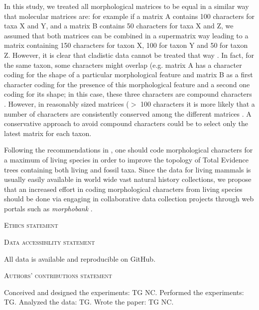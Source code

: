 \documentclass[12pt,letterpaper]{article}
\renewcommand{\section}[1]{%
\bigskip
\begin{center}
\begin{Large}
\normalfont\scshape #1
\medskip
\end{Large}
\end{center}}
\begin{document}
In this study, we treated all morphological matrices to be equal in a similar way that molecular matrices are: for example if a matrix A contains 100 characters for taxa X and Y, and a matrix B contains 50 characters for taxa X and Z, we assumed that both matrices can be combined in a supermatrix way leading to a matrix containing 150 characters for taxon X, 100 for taxon Y and 50 for taxon Z.
However, it is clear that cladistic data cannot be treated that way \citep{Brazeau2011}.
In fact, for the same taxon, some characters might overlap (e.g.
matrix A has a character coding for the shape of a particular morphological feature and matrix B as a first character coding for the presence of this morphological feature and a second one coding for its shape; in this case, these three characters are compound characters \citep{Brazeau2011}.
However, in reasonably sized matrices ($>$ 100 characters \citep{GuillermeCooper,harrisonamong-character2014} it is more likely that a number of characters are consistently conserved among the different matrices \citep[e.g.][]{ross1998phylogenetic,seiffert2003fossil,marivaux2005anthropoid,seiffert2005basal,bloch2007new,kay2008anatomy,silcox2008biogeographic,seiffert2009convergent,tabuce2009anthropoid,boyer2010astragalar,seiffert2010fossil,marivaux2013djebelemur,ni2013oldest}.
A conservative approach to avoid compound characters could be to select only the latest matrix for each taxon.

Following the recommendations in \citep{GuillermeCooper}, one should code morphological characters for a maximum of living species in order to improve the topology of Total Evidence trees containing both living and fossil taxa.
Since the data for living mammals is usually easily available in world wide vast natural history collections, we propose that an increased effort in coding morphological characters from living species should be done via engaging in collaborative data collection projects through web portals such as \textit{morphobank} \citep{morphobank}.

\section{Ethics statement}
\section{Data accessibility statement}
All data is available and reproducible on GitHub.
\section{Authors’ contributions statement}
Conceived and designed the experiments: TG NC. Performed the experiments: TG. Analyzed the data: TG. Wrote the paper: TG NC.
\end{document}
